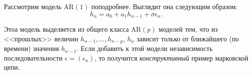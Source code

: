 Рассмотрим модель \(\mathrm{AR}(1)\) поподробнее. Выглядит она следующим 
образом:
\[
	h_{n} = a_{0} + a_{1}h_{n - 1} + \sigma\epsilon_{n}.
\]

Этоа модель выделяется из общего класса \(\mathrm{AR}(p)\) моделей тем, что из 
<<прошлых>> величин \(h_{n - 1}, \ldots, h_{n - p}\), \(h_{n}\) зависит только 
от ближайшего (по времени) значения \(h_{n - 1}\). Если добавить к этой модели 
независимость последовательности \(\epsilon = (\epsilon_{n})\), то получится 
\emph{конструктивный} пример марковской цепи.
